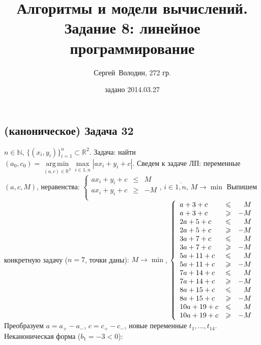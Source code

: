 \documentclass[a4paper]{article}
\date{задано 2014.03.27}
\author{Сергей~Володин, 272 гр.}
\title{Алгоритмы и модели вычислений.\\Задание 8: линейное программирование}
\DeclareMathOperator*{\argmin}{arg\,min}
\newcommand{\NN}{\mathbb{N}}
\newcommand{\RR}{\mathbb{R}}
\begin{document}
\maketitle
\subsection*{(каноническое) Задача 32}
$n\in\NN$, $\{(x_i,y_i)\}_{i=1}^n\subset\RR^2$. Задача: найти $(a_0,c_0)=\argmin\limits_{(a,c)\in\RR^2}\max\limits_{i\in\overline{1,n}}|ax_i+y_i+c|$.\newline
Сведем к задаче ЛП: переменные $(a,c,M)$, неравенства: $\left\{\begin{array}{lcr}
ax_i+y_i+c& \leqslant &M\\
ax_i+y_i+c&\geqslant &-M\\
\end{array}\right.,\,i\in\overline{1,n}$, $M\to\min$\newline
Выпишем конкретную задачу ($n=7$, точки даны):\newline
$M\to\min$,
$\left\{\begin{array}{lcr}
a+3+c & \leqslant & M\\
a+3+c & \geqslant & -M\\

2a+5+c & \leqslant & M\\
2a+5+c & \geqslant & -M\\

3a+7+c & \leqslant & M\\
3a+7+c & \geqslant & -M\\

5a+11+c & \leqslant & M\\
5a+11+c & \geqslant & -M\\

7a+14+c & \leqslant & M\\
7a+14+c & \geqslant & -M\\

8a+15+c & \leqslant & M\\
8a+15+c & \geqslant & -M\\

10a+19+c & \leqslant & M\\
10a+19+c & \geqslant & -M\\
\end{array}\right.\newline
$\newline
Преобразуем $a=a_+-a_-$, $c=c_+-c_-$, новые переменные $t_1,...,t_{14}$. Неканоническая форма ($b_1=-3<0$):\newline
\end{document}
